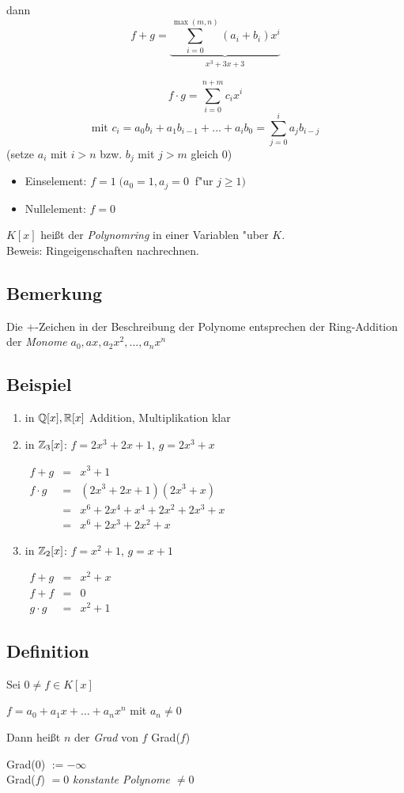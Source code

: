 dann \[f + g = \underbrace{\sum_{i=0}^{\max(m,n)}(a_i+b_i)x^i}_{x^3 + 3x +3}\]

\[f \cdot g = {\sum_{i=0}^{n+m} c_ix^i}\] 
\[\text{mit } c_i= a_0b_i+a_1b_{i-1}+ \dots + a_ib_0 = \sum_{j=0}^{i} a_jb_{i-j}  \tag{Faltungsprodukt}\]
(setze $a_i$ mit $i>n$ bzw. $b_j$ mit $j>m$ gleich 0)
\begin{itemize}
	\item
	Einselement: $f=1 \;(a_0=1, a_j = 0 \;\;$f"ur $ j\geq 1)$
	\item
	Nullelement: $f= 0$
\end{itemize}
$K[x]$ heißt der \emph{Polynomring} in einer Variablen "uber $K$.\\
Beweis: Ringeigenschaften nachrechnen.

\subsection{Bemerkung}
Die +-Zeichen in der Beschreibung der Polynome entsprechen der Ring-Addition der \emph{Monome} $a_0, ax, a_2x^2, \dots, a_nx^n$

\subsection{Beispiel}

\begin{enumerate}
	\item 
	in $\mathbb{Q}[x], \mathbb{R}[x]$ Addition, Multiplikation klar
	
	\item
	in $\mathbb{Z}_3[x]$:
	$f = 2x^3 + 2x + 1$,
	$g = 2x^3 + x$
	
	$\begin{array}{lcl}
	f + g &=& x^3 + 1 \\
	f \cdot g &=& (2x^3 + 2x + 1)(2x^3 + x) \\
	&=& x^6 + 2x^4 + x^4 + 2x^2 + 2x^3 + x \\
	&=& x^6 + 2x^3 + 2x^2 + x
	\end{array}$
	
	\item
	in $\mathbb{Z}_2[x]$:
	$f = x^2 + 1$,
	$g = x + 1$
	
	$\begin{array}{lcl}
	f+g &=& x^2 + x \\
	f+f &=& 0 \\
	g \cdot g &=& x^2 + 1
	\end{array}$
	
	
\end{enumerate}


\subsection[Definition: Grad eines Polynoms]{Definition}

Sei $0 \neq f \in K[x]$

$f=a_0 + a_1x + \dots + a_nx^n$ mit $a_n \neq 0$

Dann heißt $n$ der \emph{Grad} von $f$ Grad($f$)

Grad($0$) $:= - \infty$ \\
Grad($f$) $=0$ \quad \emph{konstante Polynome $\neq 0$}

















